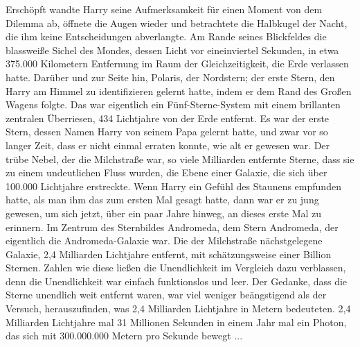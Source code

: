 Erschöpft wandte Harry seine Aufmerksamkeit für einen Moment von dem Dilemma ab,
öffnete die Augen wieder und betrachtete die Halbkugel der Nacht, die ihm keine
Entscheidungen abverlangte. Am Rande seines Blickfeldes die blassweiße Sichel
des Mondes, dessen Licht vor eineinviertel Sekunden, in etwa 375.000 Kilometern
Entfernung im Raum der Gleichzeitigkeit, die Erde verlassen hatte. Darüber und
zur Seite hin, Polaris, der Nordstern; der erste Stern, den Harry am Himmel zu
identifizieren gelernt hatte, indem er dem Rand des Großen Wagens folgte. Das
war eigentlich ein Fünf-Sterne-System mit einem brillanten zentralen Überriesen,
434 Lichtjahre von der Erde entfernt. Es war der erste \glqq{}Stern\grqq{},
dessen Namen Harry von seinem Papa gelernt hatte, und zwar vor so langer Zeit,
dass er nicht einmal erraten konnte, wie alt er gewesen war. Der trübe Nebel,
der die Milchstraße war, so viele Milliarden entfernte Sterne, dass sie zu einem
undeutlichen Fluss wurden, die Ebene einer Galaxie, die sich über 100.000
Lichtjahre erstreckte. Wenn Harry ein Gefühl des Staunens empfunden hatte, als
man ihm das zum ersten Mal gesagt hatte, dann war er zu jung gewesen, um sich
jetzt, über ein paar Jahre hinweg, an dieses erste Mal zu erinnern. Im Zentrum
des Sternbildes Andromeda, dem Stern Andromeda, der eigentlich die
Andromeda-Galaxie war. Die der Milchstraße nächstgelegene Galaxie, 2,4
Milliarden Lichtjahre entfernt, mit schätzungsweise einer Billion Sternen.
Zahlen wie diese ließen die \glqq{}Unendlichkeit\grqq{} im Vergleich dazu
verblassen, denn die \glqq{}Unendlichkeit\grqq{} war einfach funktionslos und
leer. Der Gedanke, dass die Sterne \glqq{}unendlich\grqq{} weit entfernt waren,
war viel weniger beängstigend als der Versuch, herauszufinden, was 2,4
Milliarden Lichtjahre in Metern bedeuteten. 2,4 Milliarden Lichtjahre mal 31
Millionen Sekunden in einem Jahr mal ein Photon, das sich mit 300.000.000 Metern
pro Sekunde bewegt ...

